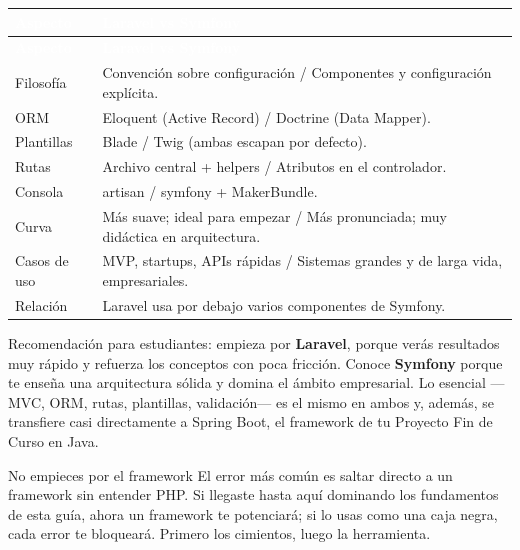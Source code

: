 \documentclass[11pt]{article}
\begin{document}
{\renewcommand{\arraystretch}{1.25}
\begin{longtable}{>{\raggedright\arraybackslash}p{2.6cm} >{\raggedright\arraybackslash}p{12.8cm}}
\rowcolor{phpazul}\textcolor{white}{\textbf{Aspecto}} & \textcolor{white}{\textbf{Laravel  vs  Symfony}} \\
\endfirsthead
\rowcolor{phpazul}\textcolor{white}{\textbf{Aspecto}} & \textcolor{white}{\textbf{Laravel  vs  Symfony}} \\
\endhead
\ttfamily\color{phpazul}Filosofía & Convención sobre configuración / Componentes y configuración explícita. \\ \hline
\ttfamily\color{phpazul}ORM & Eloquent (Active Record) / Doctrine (Data Mapper). \\ \hline
\ttfamily\color{phpazul}Plantillas & Blade / Twig (ambas escapan por defecto). \\ \hline
\ttfamily\color{phpazul}Rutas & Archivo central + helpers / Atributos en el controlador. \\ \hline
\ttfamily\color{phpazul}Consola & artisan / symfony + MakerBundle. \\ \hline
\ttfamily\color{phpazul}Curva & Más suave; ideal para empezar / Más pronunciada; muy didáctica en arquitectura. \\ \hline
\ttfamily\color{phpazul}Casos de uso & MVP, startups, APIs rápidas / Sistemas grandes y de larga vida, empresariales. \\ \hline
\ttfamily\color{phpazul}Relación & Laravel usa por debajo varios componentes de Symfony. \\ \hline
\end{longtable}}
Recomendación para estudiantes: empieza por \textbf{Laravel}, porque verás resultados muy rápido y refuerza los conceptos con poca fricción. Conoce \textbf{Symfony} porque te enseña una arquitectura sólida y domina el ámbito empresarial. Lo esencial —MVC, ORM, rutas, plantillas, validación— es el mismo en ambos y, además, se transfiere casi directamente a Spring Boot, el framework de tu Proyecto Fin de Curso en Java.

\begin{cajatip}{No empieces por el framework}
El error más común es saltar directo a un framework sin entender PHP. Si llegaste hasta aquí dominando los fundamentos de esta guía, ahora un framework te potenciará; si lo usas como una caja negra, cada error te bloqueará. Primero los cimientos, luego la herramienta.\par
\end{cajatip}
\end{document}
